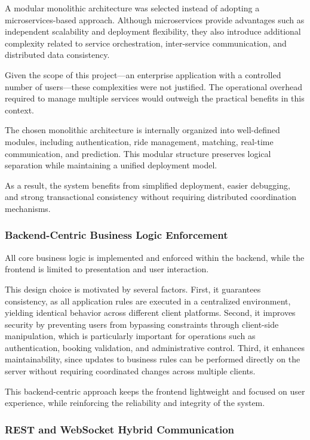 A modular monolithic architecture was selected instead of adopting a microservices-based approach. Although microservices provide advantages such as independent scalability and deployment flexibility, they also introduce additional complexity related to service orchestration, inter-service communication, and distributed data consistency.

Given the scope of this project---an enterprise application with a controlled number of users---these complexities were not justified. The operational overhead required to manage multiple services would outweigh the practical benefits in this context.

The chosen monolithic architecture is internally organized into well-defined modules, including authentication, ride management, matching, real-time communication, and prediction. This modular structure preserves logical separation while maintaining a unified deployment model.

As a result, the system benefits from simplified deployment, easier debugging, and strong transactional consistency without requiring distributed coordination mechanisms.

\subsubsection{Backend-Centric Business Logic Enforcement}

All core business logic is implemented and enforced within the backend, while the frontend is limited to presentation and user interaction.

This design choice is motivated by several factors. First, it guarantees consistency, as all application rules are executed in a centralized environment, yielding identical behavior across different client platforms. Second, it improves security by preventing users from bypassing constraints through client-side manipulation, which is particularly important for operations such as authentication, booking validation, and administrative control. Third, it enhances maintainability, since updates to business rules can be performed directly on the server without requiring coordinated changes across multiple clients.

This backend-centric approach keeps the frontend lightweight and focused on user experience, while reinforcing the reliability and integrity of the system.

\subsubsection{REST and WebSocket Hybrid Communication}

